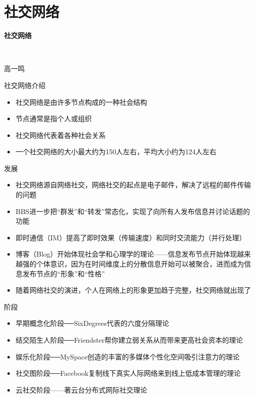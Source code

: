 \section*{社交网络}

\begin{frame}
	\centerline{\textbf{\Large{社交网络}}} 
	~\\
	\centerline{\large{高一鸣}}
\end{frame}


\begin{frame}
	社交网络介绍
	
	\begin{itemize}
		\item 社交网络是由许多节点构成的一种社会结构
		\item 节点通常是指个人或组织
		\item 社交网络代表着各种社会关系
		\item 一个社交网络的大小最大约为150人左右，平均大小约为124人左右 
	\end{itemize}

\end{frame}

\begin{frame}
	发展
	\begin{itemize}
		\item 社交网络源自网络社交，网络社交的起点是电子邮件，解决了远程的邮件传输的问题
		\item BBS进一步把“群发”和“转发”常态化，实现了向所有人发布信息并讨论话题的功能
		\item 即时通信（IM）提高了即时效果（传输速度）和同时交流能力（并行处理）
		\item 博客（Blog）开始体现社会学和心理学的理论——信息发布节点开始体现越来越强的个体意识，因为在时间维度上的分散信息开始可以被聚合，进而成为信息发布节点的“形象”和“性格”
		\item 随着网络社交的演进，个人在网络上的形象更加趋于完整，社交网络就出现了
	\end{itemize}

\end{frame}

\begin{frame}
	阶段
	\begin{itemize}
		\item 早期概念化阶段──SixDegrees代表的六度分隔理论
		\item 结交陌生人阶段──Friendster帮你建立弱关系从而带来更高社会资本的理论
		\item 娱乐化阶段──MySpace创造的丰富的多媒体个性化空间吸引注意力的理论
		\item 社交图阶段──Facebook复制线下真实人际网络来到线上低成本管理的理论
		\item 云社交阶段——著云台分布式网际社交理论
	\end{itemize}

\end{frame}

